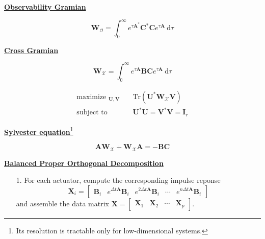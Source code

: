 \documentclass[aspectratio=169, usenames, dvipsnames]{beamer}
\DeclareMathOperator*{\maximize}{maximize~}
\DeclareMathOperator*{\subto}{subject~to~}
\begin{document}
\begin{frame}
  \vfill
  \centering

  \underline{\textbf{Observability Gramian}}

  \bigskip

  \Large
  {
    \[
    \bm{W}_{\mathcal{O}} = \displaystyle \int_0^{\infty} e^{\tau \bm{A}^*} \bm{C}^* \bm{C} e^{\tau \bm{A}} \ \mathrm{d}\tau
    \]
  }

  \vfill
\end{frame}


\begin{frame}
  \vfill
  \centering

  \underline{\textbf{Cross Gramian}}

  \bigskip

  \Large
  {
    \[
    \bm{W}_{\mathcal{X}} = \displaystyle \int_0^{\infty} e^{\tau \bm{A}} \bm{B} \bm{C} e^{\tau \bm{A}} \ \mathrm{d}\tau
    \]
  }

  \vfill
\end{frame}

\begin{frame}
  \vfill

  \Large
  \[
  \begin{aligned}
    \maximize_{\bm{U}, \bm{V}} & \quad \mathrm{Tr} \left( \bm{U}^* \bm{W}_{\mathcal{X}} \bm{V} \right) \\
    \subto & \quad \bm{U}^* \bm{U} = \bm{V}^* \bm{V} = \bm{I}_r
  \end{aligned}
  \]

  \vfill
\end{frame}

\begin{frame}
  \vfill
  \centering

  \underline{\textbf{Sylvester equation}}{\footnote{Its resolution is tractable only for low-dimensional systems.}}

  \Large

  \[
  \bm{AW}_{\mathcal{X}} + \bm{W}_{\mathcal{X}} \bm{A} = - \bm{BC}
  \]
  \vfill
\end{frame}

\begin{frame}
  \vfill

  \centering
  \underline{\textbf{Balanced Proper Orthogonal Decomposition}}

  \vfill

  \begin{enumerate}
    \item[1.] For each actuator, compute the corresponding impulse reponse
    \[
    \bm{X}_i
    =
    \begin{bmatrix}
      \bm{B}_i & e^{\Delta t \bm{A}} \bm{B}_i & e^{2\Delta t \bm{A}} \bm{B}_i & \cdots & e^{n \Delta t \bm{A}} \bm{B}_i
    \end{bmatrix}
    \]
    and assemble the data matrix $\bm{X} = \begin{bmatrix} \bm{X}_1 & \bm{X}_2 & \cdots & \bm{X}_p \end{bmatrix}$.
  \end{enumerate}

  \vfill
\end{frame}
\end{document}
